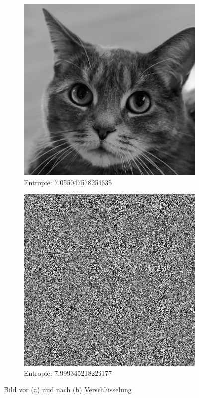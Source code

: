 \begin{figure}
	\centering

	\begin{subfigure}{0.35\textwidth}
		\includegraphics[width=\textwidth]{../1/3/gray_7.055047578254635_cat.jpg}
		\caption{Entropie: 7.055047578254635}
	\end{subfigure}
	\hfill
	\begin{subfigure}{0.35\textwidth}
		\includegraphics[width=\textwidth]{../1/3/encrypted_7.9993452182261775_cat.jpg}
		\caption{Entropie: 7.999345218226177}
	\end{subfigure}

	\caption{Bild vor (a) und nach (b) Verschlüsselung}
	\label{fig:cat}
\end{figure}

